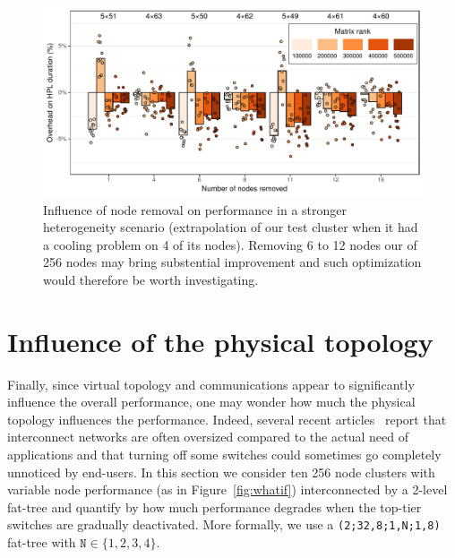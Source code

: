         \begin{figure}[htpb]
            \centering
            \includegraphics[width=\linewidth]{img/prediction/sensibility/spatial/whatif_removing_nodes_2_heterogeneous.pdf}
            \caption{Influence of node removal on performance in a stronger heterogeneity scenario (extrapolation of our
            test cluster when it had a cooling problem on 4 of its nodes). Removing 6 to 12 nodes our of 256 nodes may
            bring substential improvement and such optimization would therefore be worth investigating.}
            \label{fig:whatif_removing_nodes_heterogeneous}
        \end{figure}

    \section{Influence of the physical topology}%
    \label{sec:influence_of_physical_topology}

        Finally, since virtual topology and communications appear to significantly influence the overall performance,
        one may wonder how much the physical topology influences the performance. Indeed, several recent
        articles~\cite{tapered_fat_tree_16,tapered_fat_tree_19} report that interconnect networks are often oversized
        compared to the actual need of applications and that turning off some switches could sometimes go completely
        unnoticed by end-users. In this section we consider ten 256 node clusters with variable node performance (as in
        Figure~\ref{fig:whatif}) interconnected by a 2-level fat-tree and quantify by how much performance degrades when
        the top-tier switches are gradually deactivated. More formally, we use a \texttt{(2;32,8;1,N;1,8)} fat-tree with
        \(\texttt{N}\in\{1,2,3,4\}\).

